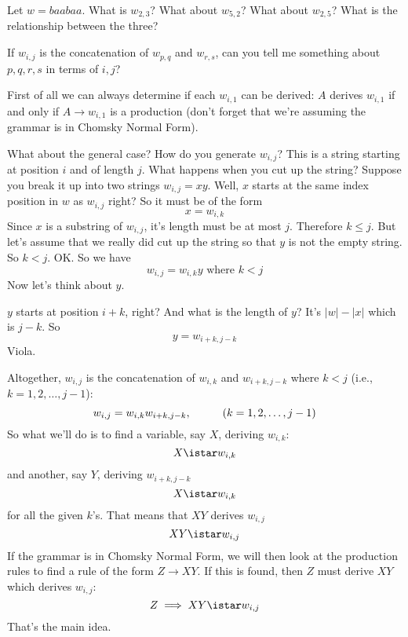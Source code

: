 \newpage
\begin{ex}
  \begin{tightlist}
    \item
      Let $w = baabaa$. What is $w_{2,3}$? What about $w_{5,2}$?
      What about $w_{2,5}$?
      What is the relationship between the three?
    \item
      If $w_{i,j}$ is the concatenation of $w_{p,q}$ and $w_{r,s}$,
      can you tell me something about $p,q,r,s$ in terms of $i,j$?
    \end{tightlist}
\end{ex}




\newpage
First of all we can always determine if each $w_{i,1}$ can be
derived:
$A$ derives $w_{i,1}$ if and only if $A \rightarrow w_{i,1}$ is a production
(don't forget that we're assuming the grammar is in Chomsky Normal Form).


What about the general case?
How do you generate $w_{i,j}$?
This is a string starting at position $i$ and of length $j$.
What happens when you cut up the string?
Suppose you break it up into two strings $w_{i,j} = xy$.
Well, $x$ starts at the same index position in $w$ as $w_{i,j}$ right?
So it must be of the form
\[
x = w_{i,k}
\]
Since $x$ is a substring of $w_{i,j}$, it's length must be at most $j$.
Therefore $k \leq j$.
But let's assume that we really did cut up the string so that $y$ is not the 
empty string.
So $k < j$.
OK.
So we have
\[
  w_{i,j} = w_{i,k} y \text{ where } k < j
\]
Now let's think about $y$.

$y$ starts at position $i + k$, right?
And what is the length of $y$?
It's $|w| - |x|$ which is $j - k$.
So
\[
  y = w_{i + k, j - k}
\]
Viola.

Altogether, 
$w_{i,j}$ is the concatenation of $w_{i,k}$ and $w_{i+k, j-k}$
where $k < j$ (i.e., $k = 1, 2, \ldots, j - 1$):
\[
w_{i,j} = w_{i,k} w_{i+k, j-k}, \hskip 1cm (k = 1, 2, \ldots, j - 1)
\]
So what we'll do is
to find a variable, say $X$, deriving $w_{i,k}$:
\[
  X \istar w_{i,k}
\]
and 
another, say $Y$, deriving $w_{i+k, j-k}$
\[
  X \istar w_{i,k}
\]
for all the given $k$'s.
That means that $XY$ derives $w_{i,j}$
\[
  XY \istar w_{i,j}
\]
If the grammar is in Chomsky Normal Form, we will then look at the 
production rules to find a rule of the form $Z \rightarrow XY$.
If this is found, then $Z$ must derive $XY$ which derives $w_{i,j}$:
\[
  Z \implies XY \istar w_{i,j}
\]
That's the main idea.

